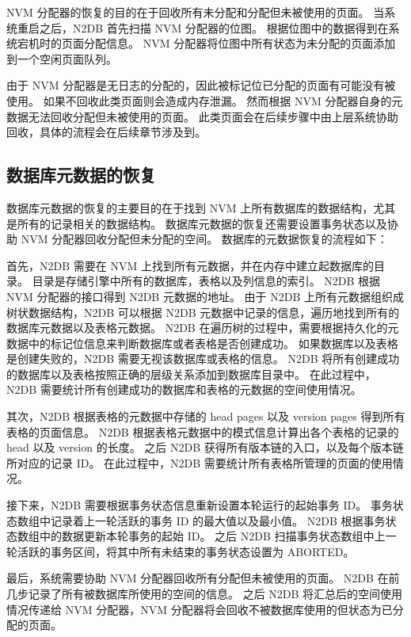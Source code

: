 NVM 分配器的恢复的目的在于回收所有未分配和分配但未被使用的页面。
当系统重启之后，N2DB 首先扫描 NVM 分配器的位图。
根据位图中的数据得到在系统宕机时的页面分配信息。
NVM 分配器将位图中所有状态为未分配的页面添加到一个空闲页面队列。

由于 NVM 分配器是无日志的分配的，因此被标记位已分配的页面有可能没有被使用。
如果不回收此类页面则会造成内存泄漏。
然而根据 NVM 分配器自身的元数据无法回收分配但未被使用的页面。
此类页面会在后续步骤中由上层系统协助回收，具体的流程会在后续章节涉及到。

\subsection{数据库元数据的恢复}
\label{ssec:metadata-recovery}

数据库元数据的恢复的主要目的在于找到 NVM 上所有数据库的数据结构，尤其是所有的记录相关的数据结构。
数据库元数据的恢复还需要设置事务状态以及协助 NVM 分配器回收分配但未分配的空间。
数据库的元数据恢复的流程如下：

首先，N2DB 需要在 NVM 上找到所有元数据，并在内存中建立起数据库的目录。
目录是存储引擎中所有的数据库，表格以及列信息的索引。
N2DB 根据 NVM 分配器的接口得到 N2DB 元数据的地址。
由于 N2DB 上所有元数据组织成树状数据结构，N2DB 可以根据 N2DB 元数据中记录的信息，遍历地找到所有的数据库元数据以及表格元数据。
N2DB 在遍历树的过程中，需要根据持久化的元数据中的标记位信息来判断数据库或者表格是否创建成功。
如果数据库以及表格是创建失败的，N2DB 需要无视该数据库或表格的信息。
N2DB 将所有创建成功的数据库以及表格按照正确的层级关系添加到数据库目录中。
在此过程中，N2DB 需要统计所有创建成功的数据库和表格的元数据的空间使用情况。

其次，N2DB 根据表格的元数据中存储的 head pages 以及 version pages 得到所有表格的页面信息。
N2DB 根据表格元数据中的模式信息计算出各个表格的记录的 head 以及 version 的长度。
之后 N2DB 获得所有版本链的入口，以及每个版本链所对应的记录 ID。
在此过程中，N2DB 需要统计所有表格所管理的页面的使用情况。

接下来，N2DB 需要根据事务状态信息重新设置本轮运行的起始事务 ID。
事务状态数组中记录着上一轮活跃的事务 ID 的最大值以及最小值。
N2DB 根据事务状态数组中的数据更新本轮事务的起始 ID。
之后 N2DB 扫描事务状态数组中上一轮活跃的事务区间，将其中所有未结束的事务状态设置为 ABORTED。

最后，系统需要协助 NVM 分配器回收所有分配但未被使用的页面。
N2DB 在前几步记录了所有被数据库所使用的空间的信息。
之后 N2DB 将汇总后的空间使用情况传递给 NVM 分配器，NVM 分配器将会回收不被数据库使用的但状态为已分配的页面。



